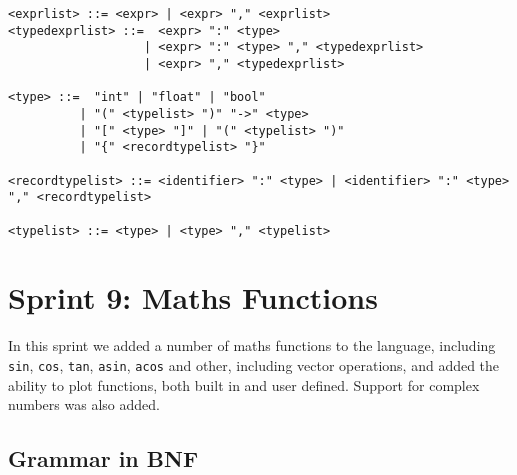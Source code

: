 \begin{verbatim}
<exprlist> ::= <expr> | <expr> "," <exprlist>
<typedexprlist> ::=  <expr> ":" <type> 
                   | <expr> ":" <type> "," <typedexprlist>
                   | <expr> "," <typedexprlist>
    
<type> ::=  "int" | "float" | "bool" 
          | "(" <typelist> ")" "->" <type> 
          | "[" <type> "]" | "(" <typelist> ")"
          | "{" <recordtypelist> "}"
          
<recordtypelist> ::= <identifier> ":" <type> | <identifier> ":" <type> "," <recordtypelist>

<typelist> ::= <type> | <type> "," <typelist>
\end{verbatim}

\section{Sprint 9: Maths Functions}\label{sec:maths-funcs}

In this sprint we added a number of maths functions to the language, including \texttt{sin}, \texttt{cos}, \texttt{tan},
\texttt{asin}, \texttt{acos} and other, including vector operations, and added the ability to plot functions, both 
built in and user defined.
Support for complex numbers was also added.

\subsection{Grammar in BNF}\label{subsec:grammar-in-bnf9}

